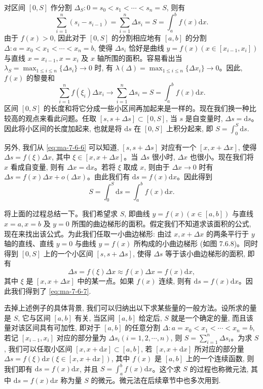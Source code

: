 对区间 $[0,S]$ 作分割 $\Delta_S:0=s_0<s_1<\cdots<s_n=S$, 则有
\begin{equation}
  \sum_{i=1}^n(s_i-s_{i-1})=\sum_{i=1}^n\Delta s_i=S=\int_a^b f(x)\mathrm dx.
  \label{eq:ma-7-6-5}
\end{equation}
由于 $f(x)>0$, 因此对于 $[0,S]$ 的分割相应地有 $[a,b]$ 的分割 $\Delta:a=x_0<x_1<\cdots<x_n=b$, 使得 $\Delta s_i$ 恰好是曲线 $y=f(x)(x\in[x_{i-1},x_i])$ 与直线 $x=x_{i-1},x=x_i$ 及 $x$ 轴所围的面积。容易看出当 $\lambda_S=\max_{1\leq i\leq n}\{\Delta s_i\}\to0$ 时, 有 $\lambda(\Delta)=\max_{1\leq i\leq n}\{\Delta x_i\}\to0$。因此, $f(x)$ 的黎曼和
\begin{equation}
  \sum_{i=1}^n f(\xi_i)\Delta x_i\to\sum_{i=1}^n\Delta s_i=S=\int_a^b f(x)\mathrm dx.
  \label{eq:ma-7-6-6}
\end{equation}
区间 $[0,S]$ 的长度和将它分成一些小区间再加起来是一样的。现在我们换一种比较高的观点来看此问题。任取 $[s,s+\Delta s]\subset[0,S]$, 当 $s$ 是自变量时, $\Delta s=\mathrm ds$。因此将小区间的长度加起来, 也就是将 $\mathrm ds$ 在 $[0,S]$ 上积分起来, 即 $S=\int_0^S\mathrm ds$.

另外, 我们从 \eqref{eq:ma-7-6-6} 可以知道, $[s,s+\Delta s]$ 对应有一个 $[x,x+\Delta x]$, 使得 $\Delta s=f(\xi)\Delta x$, 其中 $\xi\in[x,x+\Delta x]$。当 $\Delta s$ 很小时, $\Delta x$ 也很小。现在我们将 $x$ 看成自变量, 则有 $\Delta x=\mathrm dx$。若将 $\xi$ 取成 $x$, 则由于 $\Delta x\to0$ 时有 $\Delta s=f(x)\Delta x+o(\Delta x)$。由此我们有 $\mathrm ds=f(x)\mathrm dx$。因此得到
\begin{equation}
  S=\int_0^S\mathrm ds=\int_a^b f(x)\mathrm dx.
  \label{eq:ma-7-6-7}
\end{equation}

将上面的过程总结一下。我们希望求 $S$, 即曲线 $y=f(x)(x\in[a,b])$ 与直线 $x=a,x=b$ 及 $y=0$ 所围的曲边梯形的面积。假定我们不知道求该面积的公式, 现在来找出该公式。为此我们任取一小曲边梯形: 由过 $x,x+\Delta x$ 的两条平行于 $y$ 轴的直线、直线 $y=0$ 与曲线 $y=f(x)$ 所构成的小曲边梯形 (如图 7.6.8)。同时得到 $[0,S]$ 上的一个小区间 $[s,s+\Delta s]$, 使得 $\Delta s$ 等于该小曲边梯形的面积, 即有
\[
  \Delta s=f(\xi)\Delta x\approx f(x)\Delta x=f(x)\mathrm dx,
\]
其中 $\xi$ 是 $[x,x+\Delta x]$ 中的某一点。如果 $f(x)$ 连续, 则有 $\mathrm ds=f(x)\mathrm dx$。因此我们得到了 \eqref{eq:ma-7-6-7}.

去掉上述例子的具体背景, 我们可以归纳出以下求某些量的一般方法。设所求的量是 $S$, 它与区间 $[a,b]$ 有关, 当区间 $[a,b]$ 给定后, $S$ 就是一个确定的量, 而且该量对该区间具有可加性, 即对于 $[a,b]$ 的任意分割 $\Delta:a=x_0<x_1<\cdots<x_n=b$, 若记 $[x_{i-1},x_i]$ 对应的部分量为 $\Delta s_i(i=1,2,\cdots,n)$, 则 $S=\sum_{i=1}^n\Delta s_i$。为求 $S$, 我们可以任取小区间 $[x,x+\mathrm dx]\subset[a,b]$, 若 $[x,x+\mathrm dx]$ 所对应的部分量 $\Delta s=f(\xi)\mathrm dx(\xi\in[x,x+\mathrm dx])$, 其中 $f(x)$ 是 $[a,b]$ 上的一个连续函数, 则我们即有 $\mathrm ds=f(x)\mathrm dx$, 并且 $S=\int_a^b f(x)\mathrm dx$。这个求 $S$ 的过程也称微元法, 其中 $\mathrm ds=f(x)\mathrm dx$ 称为量 $S$ 的微元。微元法在后续章节中也多次用到.

